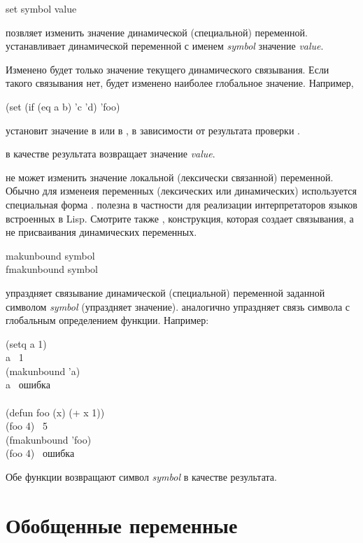 \begin{defun}[Function]
set symbol value

 позвляет изменить значение динамической (специальной) переменной.
 устанавливает динамической переменной с именем \emph{symbol} значение
\emph{value}.

Изменено будет только значение текущего динамического связывания. Если такого
связывания нет, будет изменено наиболее глобальное значение.
Например,
\begin{lisp}
(set (if (eq a b) 'c 'd) 'foo)
\end{lisp}
установит значение  в  или  в , в зависимости от
результата проверки .

 в качестве результата возвращает значение \emph{value}.

 не может изменить значение локальной (лексически связанной)
переменной.
Обычно для изменеия переменных (лексических или динамических) используется
специальная форма .
 полезна в частности для реализации интерпретаторов языков встроенных в
Lisp.
Смотрите также , конструкция, которая создает связывания, а не
присваивания динамических переменных.
\end{defun}

\begin{defun}[Function]
makunbound symbol \\
fmakunbound symbol

 упраздняет связывание динамической (специальной) переменной
заданной символом \emph{symbol} (упраздняет значение). 
аналогично упраздняет связь символа с глобальным определением функции.
Например:
\begin{lisp}
(setq a 1) \\
a \EV\ 1 \\
(makunbound 'a) \\
a \EV\ \textrm{ошибка} \\
\\
(defun foo (x) (+ x 1)) \\
(foo 4) \EV\ 5 \\
(fmakunbound 'foo) \\
(foo 4) \EV\ \textrm{ошибка}
\end{lisp}
Обе функции возвращают символ \emph{symbol} в качестве результата.
\end{defun}

\section{Обобщенные переменные}
\label{SETF-SECTION}

